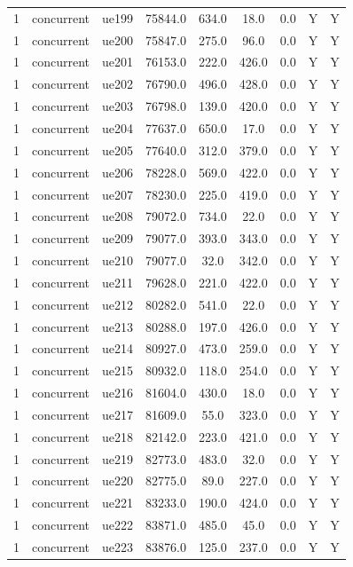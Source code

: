 \begin{table}[ht]
\begin{tabular}{|c|c|c|c|c|c|c|c|c|}
1 & concurrent & ue199 & 75844.0 & 634.0 & 18.0 & 0.0 & Y & Y \\
1 & concurrent & ue200 & 75847.0 & 275.0 & 96.0 & 0.0 & Y & Y \\
1 & concurrent & ue201 & 76153.0 & 222.0 & 426.0 & 0.0 & Y & Y \\
1 & concurrent & ue202 & 76790.0 & 496.0 & 428.0 & 0.0 & Y & Y \\
1 & concurrent & ue203 & 76798.0 & 139.0 & 420.0 & 0.0 & Y & Y \\
1 & concurrent & ue204 & 77637.0 & 650.0 & 17.0 & 0.0 & Y & Y \\
1 & concurrent & ue205 & 77640.0 & 312.0 & 379.0 & 0.0 & Y & Y \\
1 & concurrent & ue206 & 78228.0 & 569.0 & 422.0 & 0.0 & Y & Y \\
1 & concurrent & ue207 & 78230.0 & 225.0 & 419.0 & 0.0 & Y & Y \\
1 & concurrent & ue208 & 79072.0 & 734.0 & 22.0 & 0.0 & Y & Y \\
1 & concurrent & ue209 & 79077.0 & 393.0 & 343.0 & 0.0 & Y & Y \\
1 & concurrent & ue210 & 79077.0 & 32.0 & 342.0 & 0.0 & Y & Y \\
1 & concurrent & ue211 & 79628.0 & 221.0 & 422.0 & 0.0 & Y & Y \\
1 & concurrent & ue212 & 80282.0 & 541.0 & 22.0 & 0.0 & Y & Y \\
1 & concurrent & ue213 & 80288.0 & 197.0 & 426.0 & 0.0 & Y & Y \\
1 & concurrent & ue214 & 80927.0 & 473.0 & 259.0 & 0.0 & Y & Y \\
1 & concurrent & ue215 & 80932.0 & 118.0 & 254.0 & 0.0 & Y & Y \\
1 & concurrent & ue216 & 81604.0 & 430.0 & 18.0 & 0.0 & Y & Y \\
1 & concurrent & ue217 & 81609.0 & 55.0 & 323.0 & 0.0 & Y & Y \\
1 & concurrent & ue218 & 82142.0 & 223.0 & 421.0 & 0.0 & Y & Y \\
1 & concurrent & ue219 & 82773.0 & 483.0 & 32.0 & 0.0 & Y & Y \\
1 & concurrent & ue220 & 82775.0 & 89.0 & 227.0 & 0.0 & Y & Y \\
1 & concurrent & ue221 & 83233.0 & 190.0 & 424.0 & 0.0 & Y & Y \\
1 & concurrent & ue222 & 83871.0 & 485.0 & 45.0 & 0.0 & Y & Y \\
1 & concurrent & ue223 & 83876.0 & 125.0 & 237.0 & 0.0 & Y & Y \\

\end{tabular}
\end{table}
